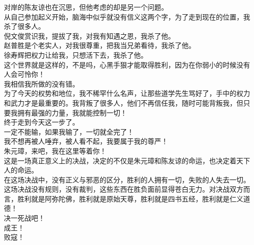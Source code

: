 \begin{multicols}{\theparacolNo}
对岸的陈友谅也在沉思，但他考虑的却是另一个问题。\\

从自己参加起义开始，脑海中似乎就没有信义这两个字，为了走到现在的位置，我杀了很多人。\\

倪文俊赏识我，提拔了我，对我有知遇之恩，我杀了他。\\

赵普胜是个老实人，对我很尊重，把我当兄弟看待，我杀了他。\\

徐寿辉把权力让给我，只想活下去，我杀了他。\\

这个世界就是这样的，不是吗，心黑手狠才能取得胜利，因为在你弱小的时候没有人会可怜你！\\

我相信我所做的没有错。\\

为了今天的权势和地位，我不稀罕什么名声，让那些道学先生骂好了，手中的权力和武力才是最重要的。我背叛了很多人，他们不再信任我，随时可能背叛我，但只要我拥有最强的力量，我就能控制一切！\\

终于走到今天这一步了。\\

一定不能输，如果我输了，一切就全完了！\\

我不想再被人唾弃，被人看不起，我要属于我的尊严！\\

朱元璋，来吧，我在这里等着你！\\

这是一场真正意义上的决战，决定的不仅是朱元璋和陈友谅的命运，也决定着天下人的命运。\\

在这场决战中，没有正义与邪恶的区分，胜利的人拥有一切，失败的人失去一切。\\

这场决战没有规则，没有裁判，这些东西在胜负面前显得苍白无力。对决战双方而言，胜利就是阿弥陀佛，胜利就是原始天尊，胜利就是四书五经，胜利就是仁义道德！\\

决一死战吧！\\

成王！\\

败寇！\\
\ifnum{}
	\end{multicols}
\fi
\newpage
